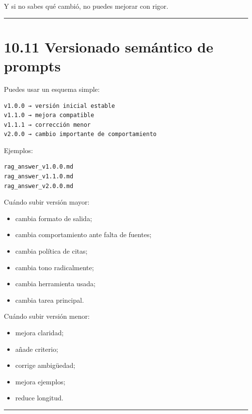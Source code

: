 Y si no sabes qué cambió, no puedes mejorar con rigor.

\begin{center}\rule{0.5\linewidth}{0.5pt}\end{center}

\section{10.11 Versionado semántico de
prompts}\label{versionado-semuxe1ntico-de-prompts}

Puedes usar un esquema simple:

\begin{lstlisting}
v1.0.0 → versión inicial estable
v1.1.0 → mejora compatible
v1.1.1 → corrección menor
v2.0.0 → cambio importante de comportamiento
\end{lstlisting}

Ejemplos:

\begin{lstlisting}
rag_answer_v1.0.0.md
rag_answer_v1.1.0.md
rag_answer_v2.0.0.md
\end{lstlisting}

Cuándo subir versión mayor:

\begin{itemize}
\tightlist
\item
  cambia formato de salida;
\item
  cambia comportamiento ante falta de fuentes;
\item
  cambia política de citas;
\item
  cambia tono radicalmente;
\item
  cambia herramienta usada;
\item
  cambia tarea principal.
\end{itemize}

Cuándo subir versión menor:

\begin{itemize}
\tightlist
\item
  mejora claridad;
\item
  añade criterio;
\item
  corrige ambigüedad;
\item
  mejora ejemplos;
\item
  reduce longitud.
\end{itemize}

\begin{center}\rule{0.5\linewidth}{0.5pt}\end{center}

